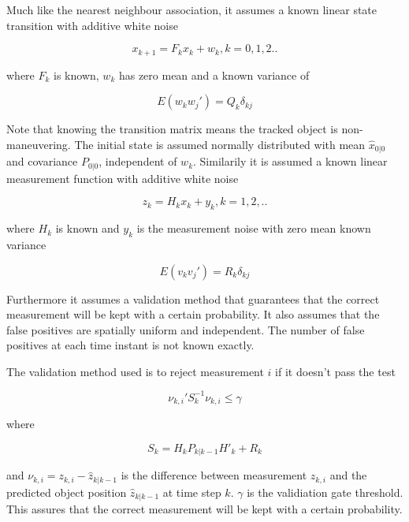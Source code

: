 Much like the nearest neighbour association, it assumes a known linear state transition with additive white noise

\begin{equation}
    x_{k+1} = F_kx_k + w_k, k=0,1,2..
\end{equation}

where $F_k$ is known, $w_k$ has zero mean and a known variance of 

\begin{equation}
    E(w_kw_j') = Q_k\delta_{kj}
\end{equation}

Note that knowing the transition matrix means the tracked object is non-maneuvering. The initial state is assumed normally distributed with mean $\hat{x}_{0|0}$ and covariance $P_{0|0}$, independent of $w_k$. Similarily it is assumed a known linear measurement function with additive white noise

\begin{equation}
    z_k = H_kx_k + y_k, k = 1,2,..
\end{equation}

where $H_k$ is known and $y_k$ is the measurement noise with zero mean known variance 

\begin{equation}
    E(v_kv_j') = R_k\delta_{kj}
\end{equation}



Furthermore it assumes a validation method that guarantees that the correct measurement will be kept with a certain probability. It also assumes that the false positives are spatially uniform and independent. The number of false positives at each time instant is not known exactly.   

The validation method used is to reject measurement $i$ if it doesn't pass the test

\begin{equation}
    \nu_{k,i}'S_k^{-1}\nu_{k,i} \leq \gamma
\end{equation}

where 

\begin{equation}
    S_k = H_kP_{k|k-1}H'_k+R_k
\end{equation}

and $\nu_{k,i} = z_{k,i} - \hat{z}_{k|k-1}$ is the difference between measurement $z_{k,i}$ and the predicted object position $\hat{z}_{k|k-1}$ at time step $k$. $\gamma$ is the validiation gate threshold. This assures that the correct measurement will be kept with a certain probability. 

